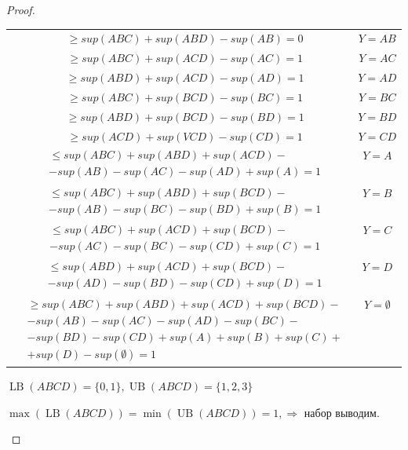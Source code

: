 \documentclass[12pt,a4paper]{article}
\DeclareMathOperator{\LB}{LB}
\DeclareMathOperator{\UB}{UB}
\begin{document}
\begin{proof}
\begin{enumerate}[label=\Alph*.]
\begin{tabular}[t]{|c|c|c|}
      & $\ge sup(ABC) + sup(ABD) - sup(AB) = 0$ & $Y = AB$ \\\cline{2-3}
      & $\ge sup(ABC) + sup(ACD) - sup(AC) = 1$ & $Y = AC$ \\\cline{2-3}
      & $\ge sup(ABD) + sup(ACD) - sup(AD) = 1$ & $Y = AD$ \\\cline{2-3}
      & $\ge sup(ABC) + sup(BCD) - sup(BC) = 1$ & $Y = BC$ \\\cline{2-3}
      & $\ge sup(ABD) + sup(BCD) - sup(BD) = 1$ & $Y = BD$ \\\cline{2-3}
      & $\ge sup(ACD) + sup(VCD) - sup(CD) = 1$ & $Y = CD$ \\\cline{2-3}
      
      & $\begin{array}{lcl} \le sup(ABC) + sup(ABD) + sup(ACD) - \\
        -sup(AB) - sup(AC) - sup(AD) + sup(A) = 1\end{array}$ & $Y = A$ \\\cline{2-3}
      
      & $\begin{array}{lcl} \le sup(ABC) + sup(ABD) + sup(BCD) - \\
        -sup(AB) - sup(BC) - sup(BD) + sup(B) = 1\end{array}$ & $Y = B$ \\\cline{2-3}
      
      & $\begin{array}{lcl} \le sup(ABC) + sup(ACD) + sup(BCD) - \\
        -sup(AC) - sup(BC) - sup(CD) + sup(C) = 1\end{array}$ & $Y = C$ \\\cline{2-3}
      
      & $\begin{array}{lcl} \le sup(ABD) + sup(ACD) + sup(BCD) - \\
        -sup(AD) - sup(BD) - sup(CD) + sup(D) = 1\end{array}$ & $Y = D$ \\\cline{2-3}

      & $\begin{array}{lcl} \ge sup(ABC) + sup(ABD) + sup(ACD) + sup(BCD) - \\
        -sup(AB) - sup(AC) - sup(AD) - sup(BC) - \\
        -sup(BD) -sup(CD) + sup(A) + sup(B) + sup(C) + \\
        +sup(D) -sup(\emptyset) = 1\end{array}$ & $Y = \emptyset$ \\
      \hline
    \end{tabular}
    \renewcommand{\arraystretch}{1}
    
    $\LB(ABCD)=\{0, 1\}, \UB(ABCD)=\{1, 2, 3\}$

    $\max(\LB(ABCD)) = \min(\UB(ABCD)) = 1, \Rightarrow$ набор выводим.
  \end{enumerate}
\end{proof}
\clearpage
\end{document}
